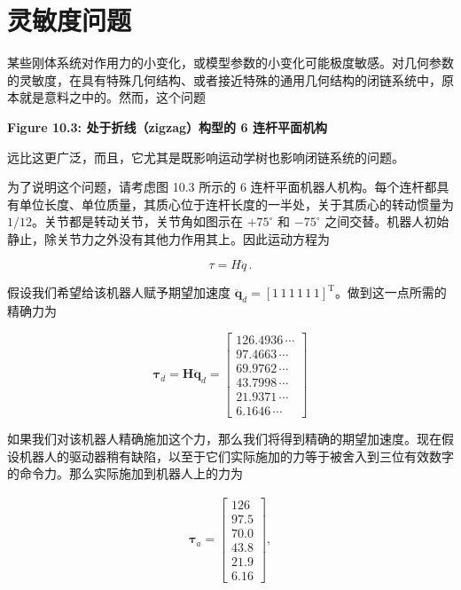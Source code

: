 \documentclass[10pt,a4paper]{book}
\theoremstyle{thmstyle} %
\theoremstyle{defstyle} %
\theoremstyle{prostyle} %
\begin{document}
\section{灵敏度问题}





某些刚体系统对作用力的小变化，或模型参数的小变化可能极度敏感。对几何参数的灵敏度，在具有特殊几何结构、或者接近特殊的通用几何结构的闭链系统中，原本就是意料之中的。然而，这个问题



\noindent\textbf{Figure 10.3: 处于折线（zigzag）构型的 6 连杆平面机构}





远比这更广泛，而且，它尤其是既影响运动学树也影响闭链系统的问题。



为了说明这个问题，请考虑图 10.3 所示的 6 连杆平面机器人机构。每个连杆都具有单位长度、单位质量，其质心位于连杆长度的一半处，关于其质心的转动惯量为 $1/12$。关节都是转动关节，关节角如图示在 $+75^{\circ}$ 和 $-75^{\circ}$ 之间交替。机器人初始静止，除关节力之外没有其他力作用其上。因此运动方程为



$$
\tau = H \ddot { q } \, .
$$



假设我们希望给该机器人赋予期望加速度 $\ddot{\mathbf{q}}_{d}=\left[1\,1\,1\,1\,1\,1\right]^{\mathrm{T}}$。做到这一点所需的精确力为



$$
\boldsymbol{ \tau } _ { d } = \boldsymbol{ H } \ddot { \boldsymbol{ q } } _ { d } = \left[ \begin{array}{l} { 12 6 . 49 36 \, \cdots } \\{ 97 . 46 63 \, \cdots } \\{ 69 . 97 62 \, \cdots } \\{ 43 . 79 98 \, \cdots } \\{ 21 . 93 71 \, \cdots } \\{ 6 . 16 46 \, \cdots } \end{array} \right]
$$



如果我们对该机器人精确施加这个力，那么我们将得到精确的期望加速度。现在假设机器人的驱动器稍有缺陷，以至于它们实际施加的力等于被舍入到三位有效数字的命令力。那么实际施加到机器人上的力为



$$
\begin{array}{r} { \boldsymbol{ \tau } _ { a } = \left[ \begin{array}{l} { 12 6 } \\{ 97 . 5 } \\{ 70 . 0 } \\{ 43 . 8 } \\{ 21 . 9 } \\{ 6 . 16 } \end{array} \right] , } \end{array}
$$
\end{document}
